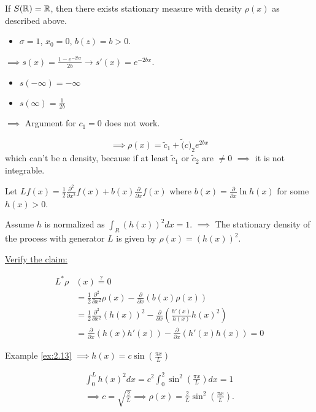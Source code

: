 \begin{lemma}\label{lem:2.18}
    If $S(\mathbb{R})=\mathbb{R}$, then there exists stationary measure with density $\rho(x)$ as described above.
\end{lemma}

\begin{itemize}
    \item $\sigma=1$, $x_0=0$, $b(z)=b>0$.
\end{itemize} 

$\implies s(x)=\frac{1-e^{-2bx}}{2b}\to s'(x)=e^{-2bx}$.

\begin{itemize}
    \item $s(-\infty)=-\infty$
    \item $s(\infty)=\frac{1}{2b}$
\end{itemize}

$\implies $ Argument for $c_1=0$ does not work.

\[\implies \rho(x)=\tilde{c}_1+\tilde(c)_2e^{2bx}\]
which can't be a density, because if at least $\tilde{c}_1$ or $\tilde{c}_2$ are $\neq 0$
$\implies$ it is not integrable.


\begin{example}\label{ex:2.19}
    Let $Lf(x)=\frac{1}{2}\frac{\partial^2}{\partial x^2} f(x)+b(x)\frac{\partial }{\partial x}f(x)$
    where $b(x)=\frac{\partial}{\partial x}\ln h(x)$ for some $h(x)>0$.


    Assume $h$ is normalized as $\int_R (h(x))^2 dx=1$. 
    $\implies$  The stationary density of the process with generator $L$ is given by 
    $\rho(x)=(h(x))^2$.

    \underline{Verify the claim:}

    \begin{align*}
        L^*\rho&(x)\stackrel{?}{=}0\\
        &=\frac{1}{2}\frac{\partial^2}{\partial x^2} \rho(x)-\frac{\partial}{\partial x}(b(x)\rho(x))\\
        &=\frac{1}{2}\frac{\partial^2}{\partial x^2} (h(x))^2-\frac{\partial}{\partial x}(\frac{h'(x)}{h(x)}h(x)^2)\\
        &=\frac{\partial}{\partial x} (h(x)h'(x))-\frac{\partial}{\partial x}(h'(x)h(x))=0
    \end{align*}

    Example \ref{ex:2.13} $\implies h(x)=c\sin(\frac{\pi x}{L})$

    \begin{align*}
        \int_0^L h(x)^2dx=c^2\int_0^2\sin^2(\frac{\pi x}{L})dx=1\\
        \implies c=\sqrt{\frac{2}{L}}\implies \rho(x)=\frac{2}{L}\sin^2(\frac{\pi x}{L}).
    \end{align*}
\end{example}


